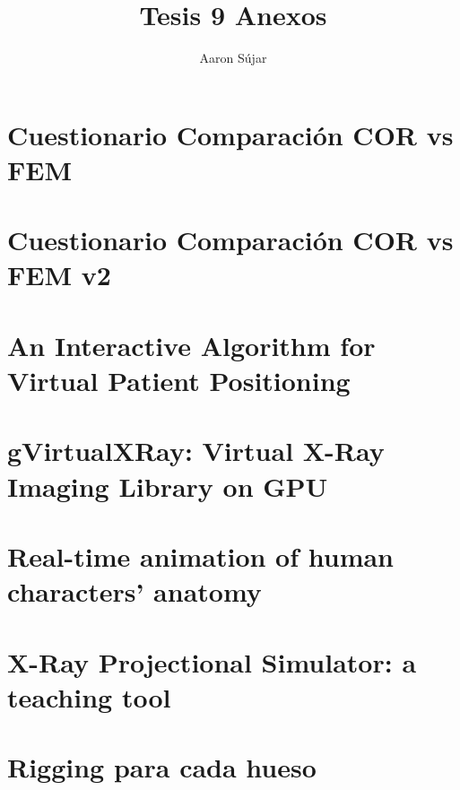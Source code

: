 \documentclass[12pt,a4paper,twoside,english]{book}
\title{Tesis 9 Anexos }
\author{Aaron Sújar}
\begin{document}
\frontmatter




%


\tableofcontents
\mainmatter
{}


\section{Cuestionario Comparación COR vs FEM }

\label{anexo:cuestionario1}

\section{Cuestionario Comparación COR vs FEM v2 }

\label{anexo:cuestionario2}

\section{An Interactive Algorithm for Virtual Patient Positioning }

\label{anexo:ceig}

\section{gVirtualXRay: Virtual X-Ray Imaging Library on GPU}
\label{anexo:cguk}


\section{Real-time animation of human characters’ anatomy}
\label{anexo:cag}



\section{X-Ray Projectional Simulator: a teaching tool}
%

\section{Rigging para cada hueso}
\label{anexo:rigging}




%
\cleardoublepage


\end{document}
